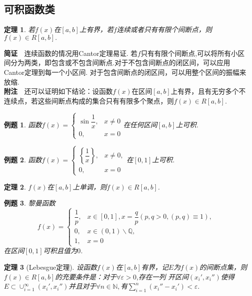 \documentclass[UTF8]{article}
\newcommand{\jz}{\textbf{简证}$\quad$}
\newcommand{\fz}{\textbf{附注}$\quad$}
\newtheorem{thm}{\hspace{2em}定理}[section]
\newtheorem{exa}{\hspace{2em}例题}[section]
\begin{document}
\subsection{可积函数类}
\begin{thm}
  若$f(x)$在$[a,b]$上有界，若$f$连续或者只有有限个间断点，则$f(x)\in R[a,b].$
\end{thm}
\jz 连续函数的情况用Cantor定理易证.
若$f$只有有限个间断点,可以将所有小区间分为两类，即包含或不包含间断点.对于不包含间断点的闭区间，可以应用Cantor定理到每一个小区间.
对于包含间断点的闭区间，可以用整个区间的振幅来放缩.\\
\fz 还可以证明如下结论：设函数$f(x)$在区间$[a,b]$上有界，且有无穷多个不连续点，若这些间断点构成的集合只有有限多个聚点，则$f(x)\in R[a,b].$
\begin{exa}
  函数$f(x)=\begin{cases}\sin\dfrac{1}{x},&x\ne0\\0,&x=0\end{cases}$在任何区间$[a,b]$上可积.
\end{exa}
\begin{exa}
  函数$f(x)=\begin{cases}\left\{\dfrac{1}{x}\right\},&x\ne0,\\0,&x=0\end{cases}$在$[0,1]$上可积.
\end{exa}
\begin{thm}
  $f(x)$在$[a,b]$上单调，则$f(x)\in R[a,b]$.
\end{thm}
\begin{exa}
  黎曼函数
  \[
    f(x)=
    \begin{cases}
      \dfrac{1}{p},&x\in[0,1],x=\dfrac{q}{p}(p,q>0,(p,q)\equiv1),\\
      0,&x\in(0,1)\backslash\mathbb{Q},\\
      1,&x=0
    \end{cases}
  \]在区间$[0,1]$可积且值为$0$.
\end{exa}
\begin{thm}[Lebesgue定理]
  设函数$f(x)$在$[a,b]$有界，记$E$为$f(x)$的间断点集，则$f(x)\in R[a,b]$的充要条件是：对于$\forall\varepsilon>0$,存在一列
  开区间$(x_i',x_i'')$使得$E\subset\cup_{i=1}^\infty(x_i',x_i'')$并且对于$\forall n\in\mathbb{N},
  $有$\sum\limits_{i=1}^n(x_i''-x_i')<\varepsilon.$
\end{thm}
\clearpage
\end{document}
